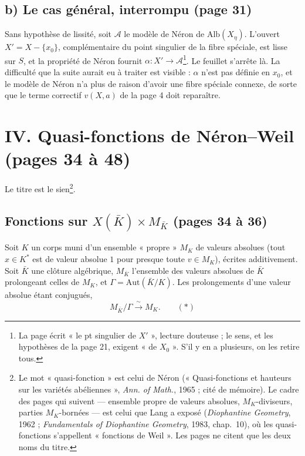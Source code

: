 \documentclass[11pt,a4paper]{article}
\begin{document}
\subsection*{b) Le cas général, interrompu (page 31)}

Sans hypothèse de lissité, soit $\mathcal{A}$ le modèle de Néron de
$\mathrm{Alb}(X_\eta)$. L'ouvert $X' = X - \{x_0\}$, complémentaire du
point singulier de la fibre spéciale, est lisse sur $S$, et la propriété de
Néron fournit $\alpha : X' \to \mathcal{A}$\footnote{La page écrit « le pt
singulier de $X'$ », lecture douteuse ; le sens, et les hypothèses de la
page 21, exigent « de $X_0$ ». S'il y en a plusieurs, on les retire tous.}.
Le feuillet s'arrête là. La difficulté que la suite aurait eu à traiter
est visible : $\alpha$ n'est pas définie en $x_0$, et le modèle de Néron
n'a plus de raison d'avoir une fibre spéciale connexe, de sorte que le
terme correctif $v(X, a)$ de la page 4 doit reparaître.

\section*{IV. Quasi-fonctions de Néron–Weil (pages 34 à 48)}

Le titre est le sien\footnote{Le mot « quasi-fonction » est celui de
Néron (« Quasi-fonctions et hauteurs sur les variétés abéliennes »,
\emph{Ann. of Math.}, 1965 ; cité de mémoire). Le cadre des pages qui
suivent — ensemble propre de valeurs absolues, $M_K$-diviseurs, parties
$M_K$-bornées — est celui que Lang a exposé (\emph{Diophantine Geometry},
1962 ; \emph{Fundamentals of Diophantine Geometry}, 1983, chap.~10), où les
quasi-fonctions s'appellent « fonctions de Weil ». Les pages ne citent que
les deux noms du titre.}.

\subsection*{Fonctions sur $X(\bar K) \times M_{\bar K}$ (pages 34 à 36)}

Soit $K$ un corps muni d'un ensemble « propre » $M_K$ de valeurs absolues
(tout $x \in K^*$ est de valeur absolue $1$ pour presque toute
$v \in M_K$), écrites additivement. Soit $\bar K$ une clôture algébrique,
$M_{\bar K}$ l'ensemble des valeurs absolues de $\bar K$ prolongeant celles
de $M_K$, et $\Gamma = \mathrm{Aut}(\bar K/K)$. Les prolongements d'une
valeur absolue étant conjugués,
\[
  M_{\bar K}/\Gamma \xrightarrow{\ \sim\ } M_K. \qquad (*)
\]
\end{document}

